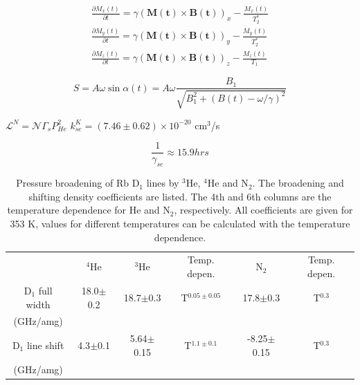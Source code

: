\documentclass[pdftex,letterpaper,12pt]{report}
\begin{document}
	
\begin{subequations}
	\begin{gather}
	\frac{\partial M_{x}(t)}{\partial t}=\gamma\left(\boldsymbol{M(t)}\times \boldsymbol{B(t)}\right)_{x}-\frac{M_{x}(t)}{T_{2}^{*}}\\
	\frac{\partial M_{y}(t)}{\partial t}=\gamma\left(\boldsymbol{M(t)}\times \boldsymbol{B(t)}\right)_{y}-\frac{M_{y}(t)}{T_{2}^{*}}\\
	\frac{\partial M_{z}(t)}{\partial t}=\gamma\left(\boldsymbol{M(t)}\times \boldsymbol{B(t)}\right)_{z}-\frac{M_{z}(t)}{T_{1}}
	\end{gather}
\end{subequations}

\begin{equation}
S=A\omega \sin{\alpha(t)}=A\omega \frac{B_{1}}{\sqrt{B_{1}^{2}+(B(t)-\omega/\gamma)^{2}}}
\end{equation}

$\mathcal{L}^{N}=\mathcal{N}\Gamma_{s}P_{He}^{2}$
$k_{se}^{K}=(7.46\pm0.62)\times10^{-20}$ cm$^{3}$/s

\begin{equation}
\frac{1}{\gamma_{se}}\approx 15.9 hrs
\end{equation}

\begin{table}[t!]
	\begin{center}
		\caption{ Pressure broadening of Rb D$_{1}$ lines by $^{3}$He, $^{4}$He and N$_{2}$. The broadening and shifting density coefficients are listed. The 4th and 6th columns are the temperature dependence for He and N$_{2}$, respectively. All coefficients are given for 353 K, values for different temperatures can be calculated with the temperature dependence.}
		\label{PBCoef}
		\begin{tabular}{ c c c c c c}
			\hline \hline
			& $^{4}$He & $^{3}$He & Temp. depen. & N$_{2}$ & Temp. depen.\\ 
			D$_{1}$ full width & 18.0$\pm$0.2 & 18.7$\pm$0.3 & T$^{0.05\pm0.05}$ & 17.8$\pm$0.3 & T$^{0.3}$\\ 
			(GHz/amg) &&&&& \\
			D$_{1}$ line shift & 4.3$\pm$0.1 & 5.64$\pm$0.15 & T$^{1.1\pm0.1}$ &
			-8.25$\pm$0.15 & T$^{0.3}$ \\ 
			(GHz/amg) &&&&& \\ \hline \hline
		\end{tabular}
	\end{center}
\end{table}
\end{document}
